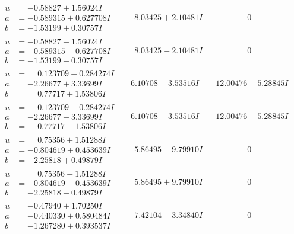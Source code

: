 \documentclass[1p]{elsarticle_modified}
\theoremstyle{definition}
\begin{document}
$$\begin{array}{c|c|c}
\begin{aligned}
u &= -0.58827 + 1.56024 I \\
a &= -0.589315 + 0.627708 I \\
b &= -1.53199 + 0.30757 I\end{aligned}
 & \phantom{-}8.03425 + 2.10481 I & \phantom{-0.000000 } 0 \\ \hline\begin{aligned}
u &= -0.58827 - 1.56024 I \\
a &= -0.589315 - 0.627708 I \\
b &= -1.53199 - 0.30757 I\end{aligned}
 & \phantom{-}8.03425 - 2.10481 I & \phantom{-0.000000 } 0 \\ \hline\begin{aligned}
u &= \phantom{-}0.123709 + 0.284274 I \\
a &= -2.26677 + 3.33699 I \\
b &= \phantom{-}0.77717 + 1.53806 I\end{aligned}
 & -6.10708 - 3.53516 I & -12.00476 + 5.28845 I \\ \hline\begin{aligned}
u &= \phantom{-}0.123709 - 0.284274 I \\
a &= -2.26677 - 3.33699 I \\
b &= \phantom{-}0.77717 - 1.53806 I\end{aligned}
 & -6.10708 + 3.53516 I & -12.00476 - 5.28845 I \\ \hline\begin{aligned}
u &= \phantom{-}0.75356 + 1.51288 I \\
a &= -0.804619 + 0.453639 I \\
b &= -2.25818 + 0.49879 I\end{aligned}
 & \phantom{-}5.86495 - 9.79910 I & \phantom{-0.000000 } 0 \\ \hline\begin{aligned}
u &= \phantom{-}0.75356 - 1.51288 I \\
a &= -0.804619 - 0.453639 I \\
b &= -2.25818 - 0.49879 I\end{aligned}
 & \phantom{-}5.86495 + 9.79910 I & \phantom{-0.000000 } 0 \\ \hline\begin{aligned}
u &= -0.47940 + 1.70250 I \\
a &= -0.440330 + 0.580484 I \\
b &= -1.267280 + 0.393537 I\end{aligned}
 & \phantom{-}7.42104 - 3.34840 I & \phantom{-0.000000 } 0 \\ \hline\begin{aligned}

\end{aligned}
\end{array}$$
\end{document}
